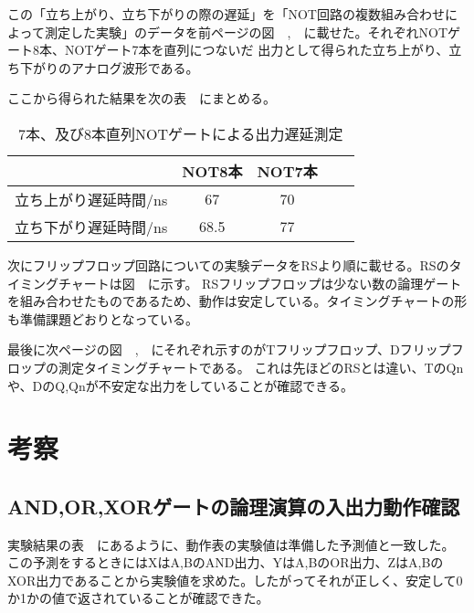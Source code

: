 \documentclass[11pt,a4j]{jsarticle}
\begin{document}
  \clearpage
  
  
  この「立ち上がり、立ち下がりの際の遅延」を「NOT回路の複数組み合わせによって測定した実験」のデータを前ページの図\ \ ,\ \ に載せた。それぞれNOTゲート8本、NOTゲート7本を直列につないだ
  出力として得られた立ち上がり、立ち下がりのアナログ波形である。
  
  ここから得られた結果を次の表\ \ にまとめる。
  
   \begin{table}[htb]
  \begin{center}
    \caption{7本、及び8本直列NOTゲートによる出力遅延測定}
    \begin{tabular}{ccccc} \toprule
 & NOT8本 & NOT7本 \\ \midrule
立ち上がり遅延時間/ns & 67 & 70 \\
立ち下がり遅延時間/ns & 68.5 & 77 \\ \bottomrule
    \end{tabular}
    \label{tab:price}
  \end{center}
\end{table}
  
  
  
  次にフリップフロップ回路についての実験データをRSより順に載せる。RSのタイミングチャートは図\ \ に示す。
  RSフリップフロップは少ない数の論理ゲートを組み合わせたものであるため、動作は安定している。タイミングチャートの形も準備課題どおりとなっている。
  
  \clearpage
  
  最後に次ページの図\ \ ,\ \ にそれぞれ示すのがTフリップフロップ、Dフリップフロップの測定タイミングチャートである。
  これは先ほどのRSとは違い、TのQnや、DのQ,Qnが不安定な出力をしていることが確認できる。
  
  

  \newpage
  
  
  
 \section{考察}
   
 
  \subsection{AND,OR,XORゲートの論理演算の入出力動作確認}
  実験結果の表\ \ にあるように、動作表の実験値は準備した予測値と一致した。　
  この予測をするときにはXはA,BのAND出力、YはA,BのOR出力、ZはA,BのXOR出力であることから実験値を求めた。したがってそれが正しく、安定して0か1かの値で返されていることが確認できた。
  
\end{document}
